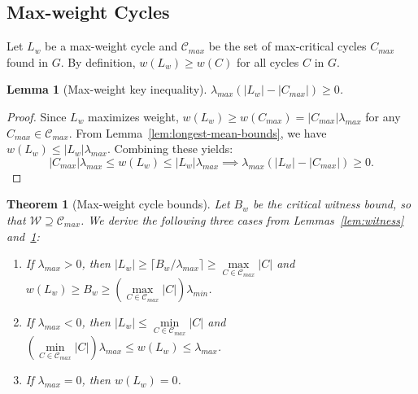 \documentclass{article}
\newtheorem{thm}{Theorem}[section]
\newtheorem{lem}{Lemma}[section]
\theoremstyle{definition}
\begin{document}
\subsection{Max-weight Cycles}
\label{sec:max-weight-case}

Let $L_w$ be a max-weight cycle and $\mathcal{C}_{max}$ be the set of
max-critical cycles $C_{max}$ found in $G$. By definition, $w(L_w) \geq
w(C)$ for all cycles $C$ in $G$.

\begin{lem}[Max-weight key inequality]
\label{lem:max-weight-key}
$\lambda_{max}(|L_w| - |C_{max}|) \geq 0$.
\end{lem}

\begin{proof}
Since $L_w$ maximizes weight, $w(L_w) \geq w(C_{max}) =
|C_{max}|\lambda_{max}$ for any $C_{max} \in \mathcal{C}_{max}$.  From
Lemma~\ref{lem:longest-mean-bounds}, we have $w(L_w) \leq
|L_w|\lambda_{max}$.  Combining these yields:
$$ |C_{max}|\lambda_{max} \leq w(L_w) \leq |L_w|\lambda_{max} \implies \lambda_{max}(|L_w| - |C_{max}|) \geq 0. $$
\end{proof}

\begin{thm}[Max-weight cycle bounds]
  \label{thm:max-weight}
  Let $B_w$ be the critical witness bound, so that $\mathcal{W}
  \supseteq \mathcal{C}_{max}$. We derive the following three cases
  from Lemmas~\ref{lem:witness} and~\ref{lem:max-weight-key}:
  \begin{enumerate}
  \item If $\lambda_{max} > 0$, then
    $|L_w| \geq \lceil B_w/\lambda_{max} \rceil \geq \max\limits_{C \in \mathcal{C}_{max}} |C|$
    and
    $w(L_w) \geq B_w \geq (\max\limits_{C \in \mathcal{C}_{max}} |C|) \lambda_{min}$.
  \item If $\lambda_{max} < 0$, then
    $|L_w| \leq \min\limits_{C \in \mathcal{C}_{max}} |C|$
    and
    $(\min\limits_{C \in \mathcal{C}_{max}} |C|)\lambda_{max} \leq w(L_w) \leq \lambda_{max}$.
    \item If $\lambda_{max} = 0$, then $w(L_w) = 0$.
\end{enumerate}
\end{thm}
\end{document}

